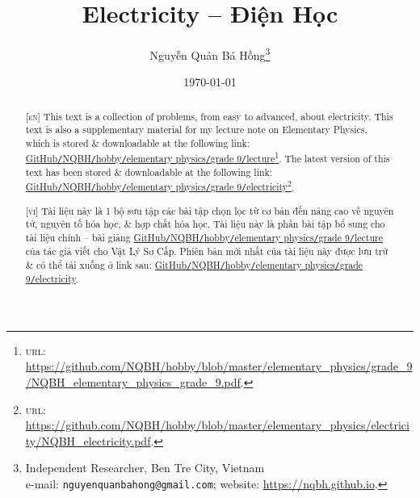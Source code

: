 \documentclass{article}
\title{Electricity -- Điện Học}
\author{Nguyễn Quản Bá Hồng\footnote{Independent Researcher, Ben Tre City, Vietnam\\e-mail: \texttt{nguyenquanbahong@gmail.com}; website: \url{https://nqbh.github.io}.}}
\date{\today}
\begin{document}
\maketitle
\begin{abstract}
	\textsc{[en]} This text is a collection of problems, from easy to advanced, about electricity. This text is also a supplementary material for my lecture note on Elementary Physics, which is stored \& downloadable at the following link: \href{https://github.com/NQBH/hobby/blob/master/elementary_physics/grade_9/NQBH_elementary_physics_grade_9.pdf}{GitHub\texttt{/}NQBH\texttt{/}hobby\texttt{/}elementary physics\texttt{/}grade 9\texttt{/}lecture}\footnote{\textsc{url}: \url{https://github.com/NQBH/hobby/blob/master/elementary_physics/grade_9/NQBH_elementary_physics_grade_9.pdf}.}. The latest version of this text has been stored \& downloadable at the following link:\\\href{https://github.com/NQBH/hobby/blob/master/elementary_physics/electricity/NQBH_electricity.pdf}{GitHub\texttt{/}NQBH\texttt{/}hobby\texttt{/}elementary physics\texttt{/}grade 9\texttt{/}electricity}\footnote{\textsc{url}: \url{https://github.com/NQBH/hobby/blob/master/elementary_physics/electricity/NQBH_electricity.pdf}.}.
	\vspace{2mm}
	
	\textsc{[vi]} Tài liệu này là 1 bộ sưu tập các bài tập chọn lọc từ cơ bản đến nâng cao về nguyên tử, nguyên tố hóa học, \& hợp chất hóa học. Tài liệu này là phần bài tập bổ sung cho tài liệu chính -- bài giảng \href{https://github.com/NQBH/hobby/blob/master/elementary_physics/grade_9/NQBH_elementary_physics_grade_9.pdf}{GitHub\texttt{/}NQBH\texttt{/}hobby\texttt{/}elementary physics\texttt{/}grade 9\texttt{/}lecture} của tác giả viết cho Vật Lý Sơ Cấp. Phiên bản mới nhất của tài liệu này được lưu trữ \& có thể tải xuống ở link sau: \href{https://github.com/NQBH/hobby/blob/master/elementary_physics/grade_9/real/NQBH_real.pdf}{GitHub\texttt{/}NQBH\texttt{/}hobby\texttt{/}elementary physics\texttt{/}grade 9\texttt{/}electricity}.
\end{abstract}
\setcounter{secnumdepth}{4}
\setcounter{tocdepth}{3}
\tableofcontents
\newpage

\end{document}
